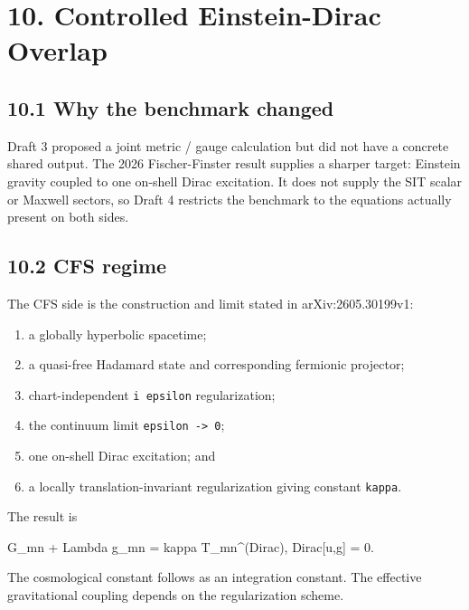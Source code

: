 \documentclass[
  american,
  11pt,
  letterpaper,
]{article}
\newenvironment{Shaded}{}{}
\newcommand{\NormalTok}[1]{#1}
\providecommand{\tightlist}{%
  \setlength{\itemsep}{0pt}\setlength{\parskip}{0pt}}
\begin{document}
\section{10. Controlled Einstein-Dirac Overlap}\label{controlled-einstein-dirac-overlap}

\subsection{10.1 Why the benchmark changed}\label{why-the-benchmark-changed}

Draft 3 proposed a joint metric / gauge calculation but did not have a concrete shared output. The 2026 Fischer-Finster result supplies a sharper target: Einstein gravity coupled to one on-shell Dirac excitation. It does not supply the SIT scalar or Maxwell sectors, so Draft 4 restricts the benchmark to the equations actually present on both sides.

\subsection{10.2 CFS regime}\label{cfs-regime}

The CFS side is the construction and limit stated in arXiv:2605.30199v1:

\begin{enumerate}
\def\labelenumi{\arabic{enumi}.}
\tightlist
\item
  a globally hyperbolic spacetime;
\item
  a quasi-free Hadamard state and corresponding fermionic projector;
\item
  chart-independent \texttt{i\ epsilon} regularization;
\item
  the continuum limit \texttt{epsilon\ -\textgreater{}\ 0};
\item
  one on-shell Dirac excitation; and
\item
  a locally translation-invariant regularization giving constant \texttt{kappa}.
\end{enumerate}

The result is

\begin{Shaded}
\begin{Highlighting}[]
\NormalTok{G\_mn + Lambda g\_mn = kappa T\_mn\^{}(Dirac),}
\NormalTok{Dirac[u,g] = 0.}
\end{Highlighting}
\end{Shaded}

The cosmological constant follows as an integration constant. The effective gravitational coupling depends on the regularization scheme.
\end{document}
